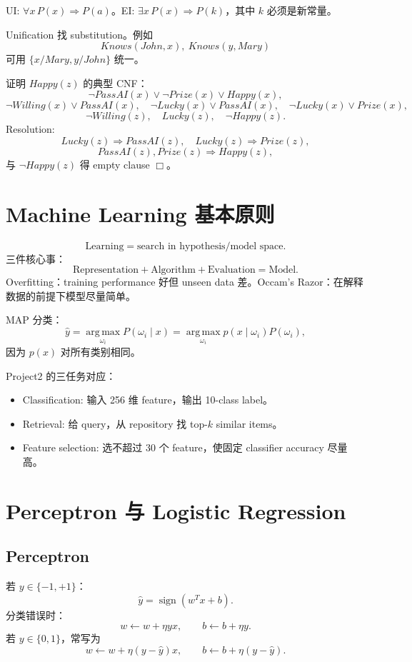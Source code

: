 \documentclass[UTF8,11pt,a4paper]{ctexart}
\newcommand{\argmax}{\operatorname*{arg\,max}}
\begin{document}
UI: $\forall x\,P(x)\Rightarrow P(a)$。EI: $\exists x\,P(x)\Rightarrow P(k)$，其中 $k$ 必须是新常量。

Unification 找 substitution。例如
\[
Knows(John,x),\ Knows(y,Mary)
\]
可用 $\{x/Mary,y/John\}$ 统一。

证明 $Happy(z)$ 的典型 CNF：
\[
\neg PassAI(x)\lor\neg Prize(x)\lor Happy(x),
\]
\[
\neg Willing(x)\lor PassAI(x),\quad
\neg Lucky(x)\lor PassAI(x),\quad
\neg Lucky(x)\lor Prize(x),
\]
\[
\neg Willing(z),\quad Lucky(z),\quad \neg Happy(z).
\]
Resolution:
\[
Lucky(z)\Rightarrow PassAI(z),\quad Lucky(z)\Rightarrow Prize(z),
\]
\[
PassAI(z),Prize(z)\Rightarrow Happy(z),
\]
与 $\neg Happy(z)$ 得 empty clause $\Box$。

\section{Machine Learning 基本原则}

\[
\text{Learning}=\text{search in hypothesis/model space}.
\]
三件核心事：
\[
\text{Representation}+\text{Algorithm}+\text{Evaluation}=\text{Model}.
\]
Overfitting：training performance 好但 unseen data 差。Occam's Razor：在解释数据的前提下模型尽量简单。

MAP 分类：
\[
\hat y=\argmax_{\omega_i}P(\omega_i\mid x)
=\argmax_{\omega_i}p(x\mid\omega_i)P(\omega_i),
\]
因为 $p(x)$ 对所有类别相同。

Project2 的三任务对应：
\begin{itemize}
\item Classification: 输入 256 维 feature，输出 10-class label。
\item Retrieval: 给 query，从 repository 找 top-$k$ similar items。
\item Feature selection: 选不超过 30 个 feature，使固定 classifier accuracy 尽量高。
\end{itemize}

\section{Perceptron 与 Logistic Regression}

\subsection{Perceptron}

若 $y\in\{-1,+1\}$：
\[
\hat y=\operatorname{sign}(w^Tx+b).
\]
分类错误时：
\[
w\leftarrow w+\eta yx,\qquad b\leftarrow b+\eta y.
\]
若 $y\in\{0,1\}$，常写为
\[
w\leftarrow w+\eta(y-\hat y)x,\qquad b\leftarrow b+\eta(y-\hat y).
\]
\end{document}
